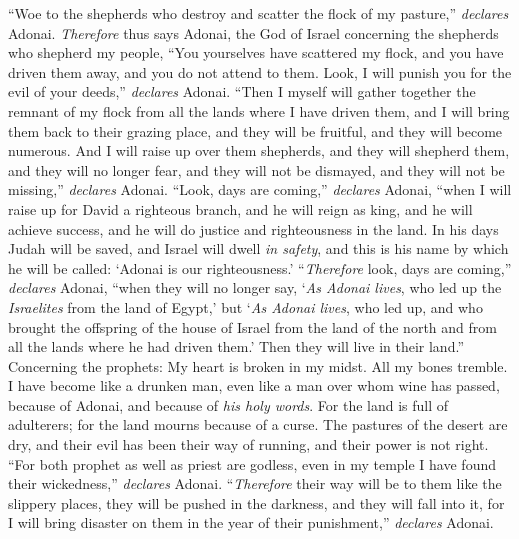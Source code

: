 \begin{biblechapter} %
 “Woe to the shepherds who destroy and scatter the flock of my pasture,” \textit{declares} Adonai.
\verse \textit{Therefore} thus says Adonai, the God of Israel concerning the shepherds who shepherd my people, “You yourselves have scattered my flock, and you have driven them away, and you do not attend to them. Look, I will punish you for the evil of your deeds,” \textit{declares} Adonai.
\verse “Then I myself will gather together the remnant of my flock from all the lands where I have driven them, and I will bring them back to their grazing place, and they will be fruitful, and they will become numerous.
\verse And I will raise up over them shepherds, and they will shepherd them, and they will no longer fear, and they will not be dismayed, and they will not be missing,” \textit{declares} Adonai.
 “Look, days are coming,” \textit{declares} Adonai, 
“when I will raise up for David a righteous branch, 
and he will reign as king, and he will achieve success, 
and he will do justice and righteousness in the land.
\verse In his days Judah will be saved, 
and Israel will dwell \textit{in safety}, 
and this is his name by which he will be called: 
‘Adonai is our righteousness.’
\verse “\textit{Therefore} look, days are coming,” \textit{declares} Adonai, “when they will no longer say, ‘\textit{As Adonai lives}, who led up the \textit{Israelites} from the land of Egypt,’
\verse but ‘\textit{As Adonai lives}, who led up, and who brought the offspring of the house of Israel from the land of the north and from all the lands where he had driven them.’ Then they will live in their land.”
 Concerning the prophets:
\verse My heart is broken in my midst. 
All my bones tremble. 
I have become like a drunken man, 
even like a man over whom wine has passed, 
because of Adonai, 
and because of \textit{his holy words}.
\verse For the land is full of adulterers; 
for the land mourns because of a curse. 
The pastures of the desert are dry, 
and their evil has been their way of running, 
and their power is not right.
\verse “For both prophet as well as priest are godless, 
even in my temple I have found their wickedness,” \textit{declares} Adonai.
\verse “\textit{Therefore} their way will be to them like the slippery places, 
they will be pushed in the darkness, 
and they will fall into it, 
for I will bring disaster on them in the year of their punishment,” \textit{declares} Adonai.

\end{biblechapter}
